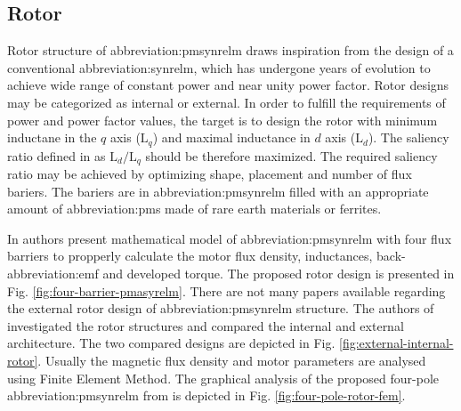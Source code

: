 \documentclass[a4paper, twoside, 11pt]{article}
\begin{document}
    \subsection{Rotor}
    Rotor structure of \gls{abbreviation:pmsynrelm} draws inspiration from the design of a conventional \gls{abbreviation:synrelm}, which has undergone years of evolution to achieve wide range of constant power and near unity power factor. Rotor designs may be categorized as internal or external. In order to fulfill the requirements of power and power factor values, the target is to design the rotor with minimum inductane in the $q$ axis ($\text{L}_q$) and maximal inductance in $d$ axis ($\text{L}_d$). The saliency ratio defined in \cite{talebi-Design-of-Permanent-Magnet-Assisted-Synchronous-Reluctance-Motors-Made-Easy} as $\text{L}_d/\text{L}_q$ should be therefore maximized. The required saliency ratio may be achieved by optimizing shape, placement and number of flux bariers. The bariers are in \gls{abbreviation:pmsynrelm} filled with an appropriate amount of \gls{abbreviation:pm}s made of rare earth materials or ferrites. \cite{talebi-Design-of-Permanent-Magnet-Assisted-Synchronous-Reluctance-Motors-Made-Easy}\par
    In \cite{talebi-Design-of-Permanent-Magnet-Assisted-Synchronous-Reluctance-Motors-Made-Easy} authors present mathematical model of \gls{abbreviation:pmsynrelm} with four flux barriers to propperly calculate the motor flux density, inductances, back-\gls{abbreviation:emf} and developed torque. The proposed rotor design is presented in Fig. \ref{fig:four-barrier-pmasyrelm}. There are not many papers available regarding the external rotor design of \gls{abbreviation:pmsynrelm} structure. The authors of \cite{bonthu-Design-of-permanent-magnet-assisted-synchronous-reluctance-motor-with-external-rotor-architecture} investigated the rotor structures and compared the internal and external architecture. The two compared designs are depicted in Fig. \ref{fig:external-internal-rotor}. Usually the magnetic flux density and motor parameters are analysed using Finite Element Method. The graphical analysis of the proposed four-pole \gls{abbreviation:pmsynrelm} from \cite{talebi-Design-of-Permanent-Magnet-Assisted-Synchronous-Reluctance-Motors-Made-Easy} is depicted in Fig. \ref{fig:four-pole-rotor-fem}.
\end{document}
